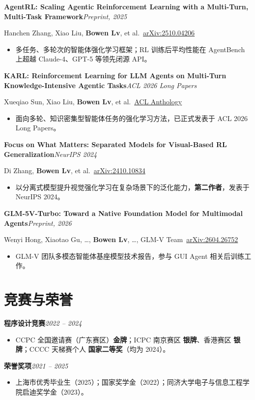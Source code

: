 \documentclass[10pt,a4paper,fontset=none]{ctexart}
\newcommand{\entry}[2]{%
  \par\vspace{1pt}%
  {\sffamily\bfseries\color{inkc}#1}\hfill{\small\itshape\color{mutedc}#2}\par
  \vspace{0.5pt}}
\newcommand{\role}[1]{{\small\color{accentd}\sffamily #1}\par\vspace{1pt}}
\begin{document}
\entry{AgentRL: Scaling Agentic Reinforcement Learning with a Multi-Turn, Multi-Task Framework}{Preprint, 2025}
\role{Hanchen Zhang, Xiao Liu, \textbf{Bowen Lv}, et al.\quad\faExternalLink*~\href{https://arxiv.org/abs/2510.04206}{arXiv:2510.04206}}
\begin{itemize}
  \item 多任务、多轮次的智能体强化学习框架；RL 训练后平均性能在 AgentBench 上超越 Claude-4、GPT-5 等领先闭源 API。
\end{itemize}

\entry{KARL: Reinforcement Learning for LLM Agents on Multi-Turn Knowledge-Intensive Agentic Tasks}{ACL 2026 Long Papers}
\role{Xueqiao Sun, Xiao Liu, \textbf{Bowen Lv}, et al.\quad\faExternalLink*~\href{https://aclanthology.org/2026.acl-long.2196/}{ACL Anthology}}
\begin{itemize}
  \item 面向多轮、知识密集型智能体任务的强化学习方法，已正式发表于 ACL 2026 Long Papers。
\end{itemize}

\entry{Focus on What Matters: Separated Models for Visual-Based RL Generalization}{NeurIPS 2024}
\role{Di Zhang, \textbf{Bowen Lv}, et al.\quad\faExternalLink*~\href{https://arxiv.org/abs/2410.10834}{arXiv:2410.10834}}
\begin{itemize}
  \item 以分离式模型提升视觉强化学习在复杂场景下的泛化能力，\textbf{第二作者}，发表于 NeurIPS 2024。
\end{itemize}

\entry{GLM-5V-Turbo: Toward a Native Foundation Model for Multimodal Agents}{Preprint, 2026}
\role{Wenyi Hong, Xiaotao Gu, \ldots, \textbf{Bowen Lv}, \ldots, GLM-V Team\quad\faExternalLink*~\href{https://arxiv.org/abs/2604.26752}{arXiv:2604.26752}}
\begin{itemize}
  \item GLM-V 团队多模态智能体基座模型技术报告，参与 GUI Agent 相关后训练工作。
\end{itemize}

\section{竞赛与荣誉}
\entry{程序设计竞赛}{2022 -- 2024}
\begin{itemize}
  \item CCPC 全国邀请赛（广东赛区）\textbf{金牌}；ICPC 南京赛区 \textbf{银牌}、香港赛区 \textbf{银牌}；CCCC 天梯赛个人 \textbf{国家二等奖}（均为 2024）。
\end{itemize}
\vspace{1pt}
\entry{荣誉奖项}{2021 -- 2025}
\begin{itemize}
  \item 上海市优秀毕业生（2025）；国家奖学金（2022）；同济大学电子与信息工程学院启迪奖学金（2023）。
\end{itemize}
\end{document}
